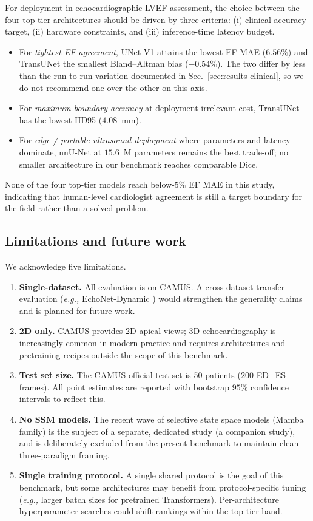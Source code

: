 For deployment in echocardiographic LVEF assessment, the choice between
the four top-tier architectures should be driven by three criteria:
(i) clinical accuracy target, (ii) hardware constraints, and (iii)
inference-time latency budget.
\begin{itemize}[leftmargin=*,nosep]
\item For \emph{tightest EF agreement}, UNet-V1 attains the lowest EF MAE
      ($6.56\%$) and TransUNet the smallest Bland--Altman bias
      ($-0.54\%$). The two differ by less than the run-to-run variation
      documented in Sec.~\ref{sec:results-clinical}, so we do not
      recommend one over the other on this axis.
\item For \emph{maximum boundary accuracy} at deployment-irrelevant cost,
      TransUNet has the lowest HD95 ($4.08$~mm).
\item For \emph{edge / portable ultrasound deployment} where
      parameters and latency dominate, nnU-Net at $15.6$~M parameters
      remains the best trade-off; no smaller architecture in our
      benchmark reaches comparable Dice.
\end{itemize}
None of the four top-tier models reach below-$5\%$ EF MAE in this study,
indicating that human-level cardiologist agreement is still a target
boundary for the field rather than a solved problem.

\subsection{Limitations and future work}
\label{sec:disc-limits}

We acknowledge five limitations.

\begin{enumerate}[leftmargin=*,nosep]
\item \textbf{Single-dataset.} All evaluation is on CAMUS. A cross-dataset
      transfer evaluation (\emph{e.g.,} EchoNet-Dynamic
      \citep{ouyang2020}) would strengthen the generality claims and is
      planned for future work.
\item \textbf{2D only.} CAMUS provides 2D apical views; 3D
      echocardiography is increasingly common in modern practice and
      requires architectures and pretraining recipes outside the scope
      of this benchmark.
\item \textbf{Test set size.} The CAMUS official test set is 50 patients
      ($200$ ED+ES frames). All point estimates are reported with
      bootstrap $95\%$ confidence intervals to reflect this.
\item \textbf{No SSM models.} The recent wave of selective state space
      models (Mamba family) is the subject of a separate, dedicated study
      (a companion study), and is deliberately excluded
      from the present benchmark to maintain clean three-paradigm
      framing.
\item \textbf{Single training protocol.} A single shared protocol is the
      goal of this benchmark, but some architectures may benefit from
      protocol-specific tuning (\emph{e.g.,} larger batch sizes for
      pretrained Transformers). Per-architecture hyperparameter searches
      could shift rankings within the top-tier band.
\end{enumerate}

